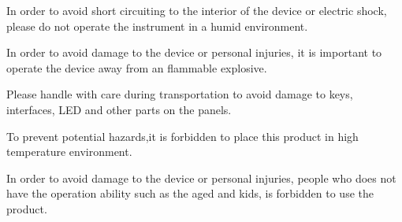 \vspace{0.7cm}

\vspace{0.2cm}
\hspace{-0.4cm}In order to avoid short circuiting to the interior of the device or electric shock, please do not operate the instrument in a humid environment. 


\vspace{0.7cm}

\vspace{0.2cm}
\hspace{-0.4cm}In order to avoid damage to the device or personal injuries, it is important to operate the device away from an flammable explosive.

\vspace{0.7cm}

\vspace{0.2cm}
\hspace{-0.4cm}Please handle with care during transportation to avoid damage to keys, interfaces, LED and other parts on the panels.

\vspace{0.7cm}

\vspace{0.2cm}
\hspace{-0.4cm}To prevent potential hazards,it is forbidden to place this product in high temperature environment.

\vspace{0.7cm}

\vspace{0.2cm}
\hspace{-0.4cm}In order to avoid damage to the device or personal injuries, people who does not have the operation ability such as the aged and kids, is forbidden to use the product.

